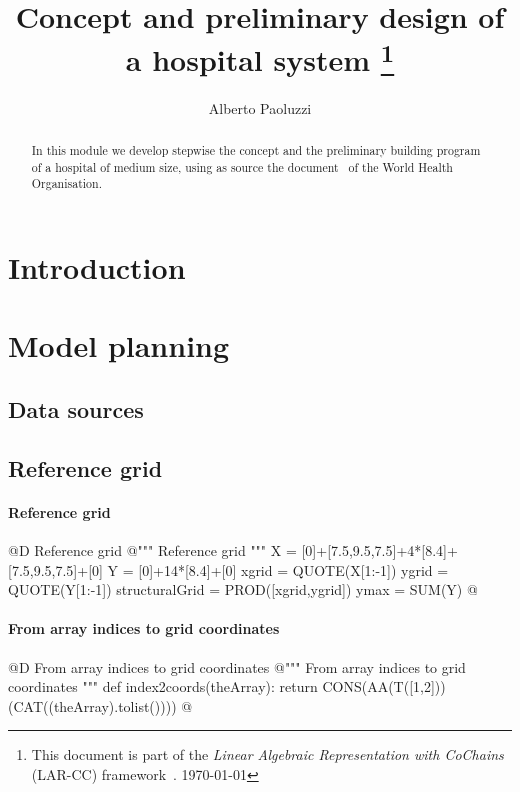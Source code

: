 \documentclass[11pt,oneside]{article}    %
\title{Concept and preliminary design of a hospital system
\footnote{This document is part of the \emph{Linear Algebraic Representation with CoChains} (LAR-CC) framework~\cite{cclar-proj:2013:00}. \today}
}
\author{Alberto Paoluzzi}
\begin{document}
\maketitle
\nonstopmode
\tableofcontents

\begin{abstract}
In this module we develop stepwise the concept and the preliminary building program of a hospital of medium size, using as source the document~\cite{who:2013} of the World Health Organisation.
\end{abstract}

\section{Introduction}


\section{Model planning}

\subsection{Data sources}

\subsection{Reference grid}

\paragraph{Reference grid}
@D Reference grid
@{""" Reference grid """
X = [0]+[7.5,9.5,7.5]+4*[8.4]+[7.5,9.5,7.5]+[0]
Y = [0]+14*[8.4]+[0]
xgrid = QUOTE(X[1:-1])
ygrid = QUOTE(Y[1:-1])
structuralGrid = PROD([xgrid,ygrid])
ymax = SUM(Y)
@}

\paragraph{From array indices to grid coordinates}
@D From array indices to grid coordinates
@{""" From array indices to grid coordinates """
def index2coords(theArray):
    return CONS(AA(T([1,2]))(CAT((theArray).tolist())))
@}
\end{document}
